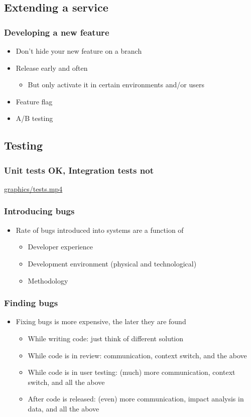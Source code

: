 \documentclass[8pt]{article}
\begin{document}
\subsection{Extending a service}
\label{sec:org93664ab}
\subsubsection{Developing a new feature}
\label{sec:orgc276235}
\begin{itemize}
\item Don't hide your new feature on a branch
\item Release early and often
\begin{itemize}
\item But only activate it in certain environments and/or users
\end{itemize}
\item Feature flag
\item A/B testing
\end{itemize}
\subsection{Testing}
\label{sec:orga33fcdf}
\subsubsection{Unit tests OK, Integration tests not}
\label{sec:orgb74ee72}
\url{graphics/tests.mp4}
\subsubsection{Introducing bugs}
\label{sec:org7e4ac57}
\begin{itemize}
\item Rate of bugs introduced into systems are a function of
\begin{itemize}
\item Developer experience
\item Development environment (physical and technological)
\item Methodology
\end{itemize}
\end{itemize}

\subsubsection{Finding bugs}
\label{sec:orgb74fe9f}
\begin{itemize}
\item Fixing bugs is more expensive, the later they are found
\begin{itemize}
\item While writing code: just think of different solution
\item While code is in review: communication, context switch, and the above
\item While code is in user testing: (much) more communication, context switch, and all the above
\item After code is released: (even) more communication, impact analysis in data, and all the above
\end{itemize}
\end{itemize}
\end{document}
